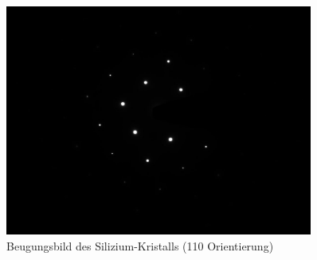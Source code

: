 \begin{figure}[p]
	\centering
	\includegraphics[width=0.9\textwidth]{data/Im_22.jpg}
	\caption{Beugungsbild des Silizium-Kristalls (110 Orientierung)}	\label{fig:Si}
	\vspace{-5em}
\end{figure}








